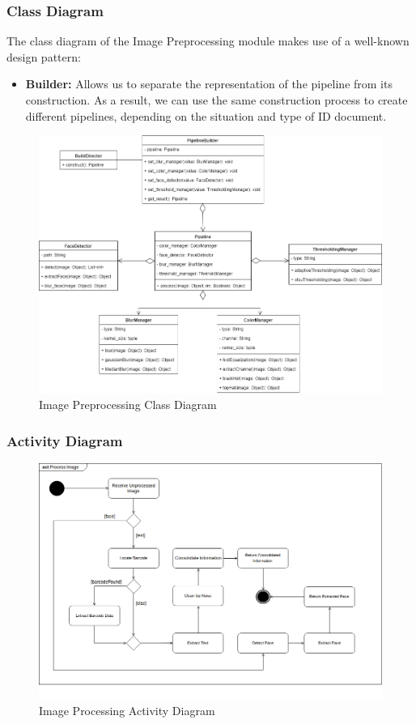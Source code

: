 \documentclass{article}
\begin{document}
\subsubsection{Class Diagram}
The class diagram of the Image Preprocessing module makes use of a well-known design pattern: 
\begin{itemize}
	\item \textbf{Builder:} Allows us to separate the representation of the pipeline from its construction. As a result, we can use the same construction process to create different pipelines, depending on the situation and type of ID document.
\end{itemize}
	\begin{figure}[H]
	    \centering
	    \includegraphics[scale=0.5]{img/imageProcessingClassDiagram.png}
	    \caption{Image Preprocessing Class Diagram}
	 \end{figure}
	 \pagebreak
\subsubsection{Activity Diagram}
	\begin{figure}[H]
	    \centering
	    \includegraphics[scale=0.5]{img/process_activity.png}
	    \caption{Image Processing Activity Diagram}
	 \end{figure}
	 \pagebreak
\end{document}
